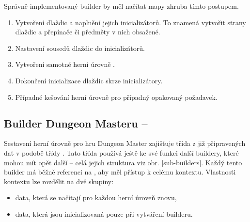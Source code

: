Správně implementovaný builder by měl načítat mapy zhruba tímto postupem. 

\begin{enumerate}

\item Vytvoření dlaždic a naplnění jejich inicializátorů. 
To znamená vytvořit strany dlaždic a přepínače či předměty v nich obsažené.

\item Nastavení sousedů dlaždic do inicializátorů. 

\item Vytvoření samotné herní úrovně .

\item Dokončení inicializace dlaždic skrze inicializátory. 

\item Případné kešování herní úrovně pro případný opakovaný požadavek. 
\end{enumerate}


\subsection{Builder Dungeon Masteru -- }

Sestavení herní úrovně pro hru Dungeon Master zajišťuje třída  z již připravených dat
v podobě třídy . Tato třída používá ještě ke své funkci další buildery, které mohou mít
opět další -- celá jejich struktura viz obr. \ref{sub-builders}. Každý tento builder má běžně referenci
na , aby měl přístup k celému kontextu. Vlastnosti kontextu lze rozdělit na dvě skupiny:
\begin{itemize}
\item data, která se načítají pro každou herní úroveň znovu,
\item data, která jsou inicializovaná pouze při vytváření builderu. 
\end{itemize}

